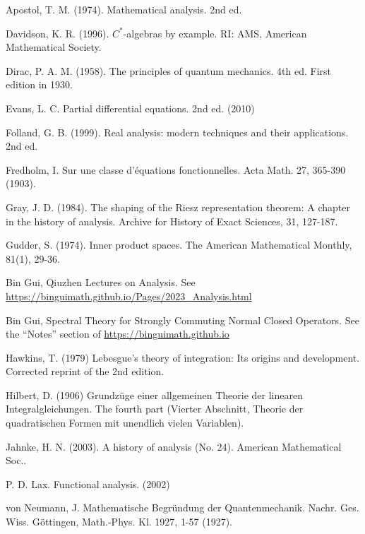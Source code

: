 \documentclass[12pt,b5paper,notitlepage]{article}
\theoremstyle{definition}
\theoremstyle{plain}
\numberwithin{equation}{section}
\begin{document}
	\begin{thebibliography}{999999}
		\footnotesize	

Apostol, T. M. (1974). Mathematical analysis. 2nd ed.

Davidson, K. R. (1996). $C^*$-algebras by example. RI: AMS, American Mathematical Society.


Dirac, P. A. M. (1958). The principles of quantum mechanics. 4th ed. First edition in 1930.

Evans, L. C. Partial differential equations. 2nd ed. (2010)


Folland, G. B. (1999). Real analysis: modern techniques and their applications. 2nd ed.

Fredholm, I. Sur une classe d'{\'e}quations fonctionnelles. Acta Math. 27, 365-390 (1903).


Gray, J. D. (1984). The shaping of the Riesz representation theorem: A chapter in the history of analysis. Archive for History of Exact Sciences, 31, 127-187.

Gudder, S. (1974). Inner product spaces. The American Mathematical Monthly, 81(1), 29-36.

Bin Gui, Qiuzhen Lectures on Analysis. See \url{https://binguimath.github.io/Pages/2023_Analysis.html}

Bin Gui, Spectral Theory for Strongly Commuting Normal Closed Operators. See the ``Notes'' section of \url{https://binguimath.github.io}
%

Hawkins, T. (1979) Lebesgue's theory of integration: Its origins and development. Corrected reprint of the 2nd edition. 

Hilbert, D. (1906) Grundz\"uge einer allgemeinen Theorie der linearen Integralgleichungen. The fourth part (Vierter Abschnitt, Theorie der quadratischen Formen mit unendlich vielen Variablen).

Jahnke, H. N. (2003). A history of analysis (No. 24). American Mathematical Soc..

P. D. Lax. Functional analysis. (2002)

von Neumann, J. Mathematische {Begr{\"u}ndung} der {Quantenmechanik}. Nachr. Ges. Wiss. G{\"o}ttingen, Math.-Phys. Kl. 1927, 1-57 (1927).



\end{thebibliography}
\end{document}
